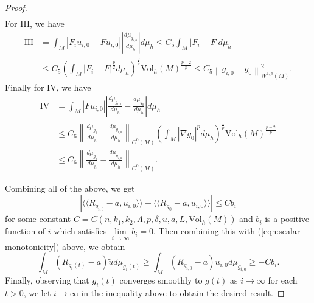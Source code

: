 \documentclass[12pt]{amsart}
\theoremstyle{plain}
\theoremstyle{plain}
\theoremstyle{definition}
\theoremstyle{remark}
\numberwithin{equation}{subsection}
\newcommand{\hdel}{\tilde{\nabla}}
\begin{document}
\begin{proof}
\begin{align*}
    \end{align*}
    For III, we have
    \begin{align*}
        \text{III} &= \int_M |F_i u_{i,0} - F u_{i,0}|\left|\frac{d\mu_{g_{i,0}}}{d\mu_h}\right|d\mu_h \leq C_5 \int_M |F_i - F|d\mu_h \nonumber \\
        &\leq C_5 \left(\int_M |F_i - F|^\frac{p}{2}d\mu_h\right)^\frac{2}{p}\text{Vol}_h(M)^\frac{p-2}{p} \leq C_5\left\lVert g_{i,0} - g_0\right\rVert_{W^{1,p}(M)}^2.
    \end{align*}
    Finally for IV, we have
    \begin{align*}
        \text{IV} &= \int_M |F u_{i,0}|\left|\frac{d\mu_{g_{i,0}}}{d\mu_h} - \frac{d\mu_{g_0}}{d\mu_h}\right|d\mu_h \nonumber \\
        &\leq C_6\left\lVert \frac{d\mu_{g_0}}{d\mu_h} - \frac{d\mu_{g_{i,0}}}{d\mu_h}\right\rVert_{C^0(M)}\left(\int_M |\hdel g_0|^pd\mu_h\right)^\frac{1}{p}\text{Vol}_h(M)^\frac{p-2}{p} \nonumber \\
        &\leq C_6\left\lVert \frac{d\mu_{g_0}}{d\mu_h} - \frac{d\mu_{g_{i,0}}}{d\mu_h}\right\rVert_{C^0(M)}.
    \end{align*}

    Combining all of the above, we get
    \begin{equation*}
        \left|\langle\langle R_{g_{i,0}}-a, u_{i,0}\rangle\rangle - \langle\langle R_{g_0} - a, u_{i,0}\rangle\rangle  \right| \leq Cb_i
    \end{equation*}
    for some constant $C = C(n,k_1,k_2,\Lambda,p,\delta,\tilde{u},a,L,\text{Vol}_h(M))$ and $b_i$ is a positive function of $i$ which satisfies $\lim\limits_{i\to\infty} b_i = 0$. Then combining this with (\ref{eqn:scalar-monotonicity}) above, we obtain
    \begin{equation*}
        \int_M (R_{g_i(t)}-a)\tilde{u}d\mu_{g_i(t)} \geq \int_M (R_{g_{i,0}}-a)u_{i,0}d\mu_{g_{i,0}} \geq -Cb_i.
    \end{equation*}
    Finally, observing that $g_i(t)$ converges smoothly to $g(t)$ as $i \to \infty$ for each $t>0$, we let $i \to \infty$ in the inequality above to obtain the desired result.
\end{proof}
%
\end{document}
